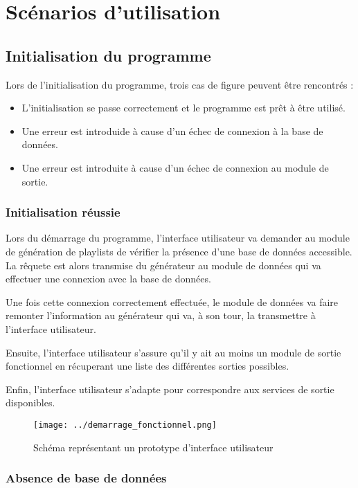 
\section{Scénarios d'utilisation}

\subsection{Initialisation du programme}
    
Lors de l'initialisation du programme, trois cas de figure peuvent être
rencontrés : 

\begin{itemize}
\item L'initialisation se passe correctement et le programme est prêt à être
utilisé.
\item Une erreur est introduide à cause d'un échec de connexion à la base de
données.
\item Une erreur est introduite à cause d'un échec de connexion au module de
sortie.
\end{itemize}

\subsubsection{Initialisation réussie}

Lors du démarrage du programme, l'interface utilisateur va demander au 
module de génération de playlists de vérifier la présence d'une base de 
données accessible. La rêquete est alors transmise du générateur au module 
de données qui va effectuer une connexion avec la base de données.
        
Une fois cette connexion correctement effectuée, le module de données va 
faire remonter l'information au générateur qui va, à son tour, la 
transmettre à l'interface utilisateur.

Ensuite, l'interface utilisateur s'assure qu'il y ait au moins un module de 
sortie fonctionnel en récuperant une liste des différentes sorties possibles.

Enfin, l'interface utilisateur s'adapte pour correspondre aux services de 
sortie disponibles.
        
\begin{figure}[!h]
\texttt{[image: ../demarrage\_fonctionnel.png]}
\caption{Schéma représentant un prototype d'interface utilisateur}          
\end{figure}
        
\subsubsection{Absence de base de données}
        
